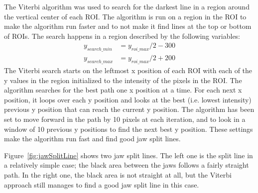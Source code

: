 \documentclass[a4paper]{article}
\begin{document}
The Viterbi algorithm was used to search for the darkest line in a region around the vertical center of each ROI. The algorithm is run on a region in the ROI to make the algorithm run faster and to not make it find lines at the top or bottom of ROIs. The search happens in a region described by the following variables:
\begin{align} 
y_{search\_min} &= y_{roi\_max} / 2 - 300\\ 
y_{search\_max} &= y_{roi\_max} / 2 + 200
\end{align}
The Viterbi search starts on the leftmost x position of each ROI with each of the y values in the region initialized to the intensity of the pixels in the ROI. The algorithm searches for the best path one x position at a time. For each next x position, it loops over each y position and looks at the best (i.e. lowest intensity) previous y position that can reach the current y position. The algorithm has been set to move forward in the path by 10 pixels at each iteration, and to look in a window of 10 previous y positions to find the next best y position. These settings make the algorithm run fast and find good jaw split lines.

Figure~\ref{fig:jawSplitLine} shows two jaw split lines. The left one is the split line in a relatively simple case; the black area between the jaws follows a fairly straight path. In the right one, the black area is not straight at all, but the Viterbi approach still manages to find a good jaw split line in this case.
\end{document}
